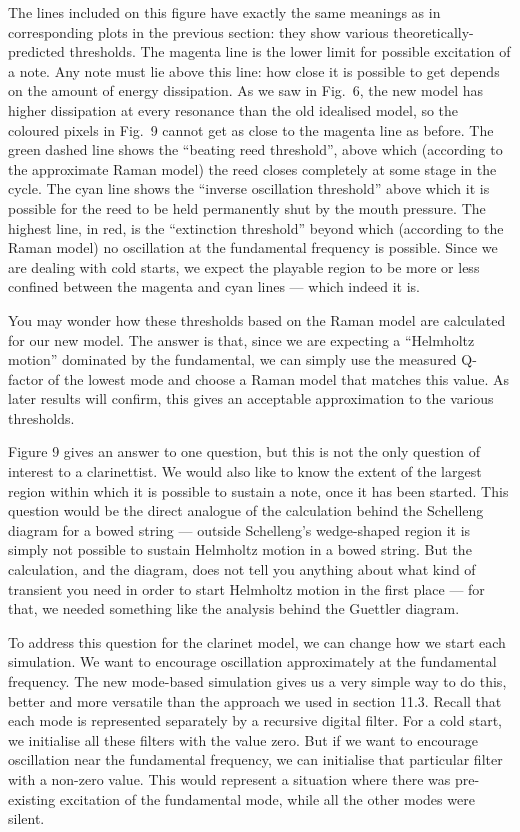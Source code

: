   The lines included on this figure have exactly the same meanings as in 
  corresponding plots in the previous section: they show various 
  theoretically-predicted thresholds. The magenta line is the lower limit for 
  possible excitation of a note. Any note must lie above this line: how close 
  it is possible to get depends on the amount of energy dissipation. As we saw 
  in Fig.\ 6, the new model has higher dissipation at every resonance than the 
  old idealised model, so the coloured pixels in Fig.\ 9 cannot get as close to 
  the magenta line as before. The green dashed line shows the “beating reed 
  threshold”, above which (according to the approximate Raman model) the reed 
  closes completely at some stage in the cycle. The cyan line shows the 
  “inverse oscillation threshold” above which it is possible for the reed to be 
  held permanently shut by the mouth pressure. The highest line, in red, is the 
  “extinction threshold” beyond which (according to the Raman model) no 
  oscillation at the fundamental frequency is possible. Since we are dealing 
  with cold starts, we expect the playable region to be more or less confined 
  between the magenta and cyan lines --- which indeed it is. 

  You may wonder how these thresholds based on the Raman model are calculated 
  for our new model. The answer is that, since we are expecting a “Helmholtz 
  motion” dominated by the fundamental, we can simply use the measured Q-factor 
  of the lowest mode and choose a Raman model that matches this value. As later 
  results will confirm, this gives an acceptable approximation to the various 
  thresholds. 

  Figure 9 gives an answer to one question, but this is not the only question 
  of interest to a clarinettist. We would also like to know the extent of the 
  largest region within which it is possible to sustain a note, once it has 
  been started. This question would be the direct analogue of the calculation 
  behind the Schelleng diagram for a bowed string — outside Schelleng’s 
  wedge-shaped region it is simply not possible to sustain Helmholtz motion in 
  a bowed string. But the calculation, and the diagram, does not tell you 
  anything about what kind of transient you need in order to start Helmholtz 
  motion in the first place — for that, we needed something like the analysis 
  behind the Guettler diagram. 

  To address this question for the clarinet model, we can change how we start 
  each simulation. We want to encourage oscillation approximately at the 
  fundamental frequency. The new mode-based simulation gives us a very simple 
  way to do this, better and more versatile than the approach we used in 
  section 11.3. Recall that each mode is represented separately by a recursive 
  digital filter. For a cold start, we initialise all these filters with the 
  value zero. But if we want to encourage oscillation near the fundamental 
  frequency, we can initialise that particular filter with a non-zero value. 
  This would represent a situation where there was pre-existing excitation of 
  the fundamental mode, while all the other modes were silent. 

